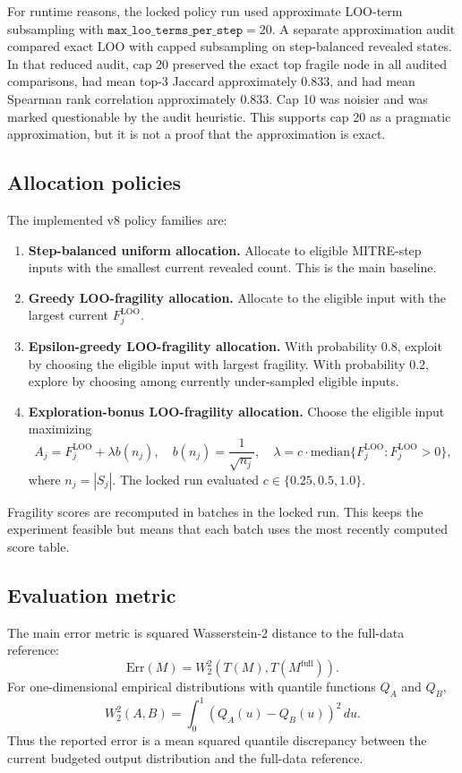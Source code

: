 \documentclass[11pt]{article}
\newcommand{\wtsq}{W_2^2}
\begin{document}
For runtime reasons, the locked policy run used approximate LOO-term subsampling with \(\texttt{max\_loo\_terms\_per\_step}=20\). A separate approximation audit compared exact LOO with capped subsampling on step-balanced revealed states. In that reduced audit, cap 20 preserved the exact top fragile node in all audited comparisons, had mean top-3 Jaccard approximately 0.833, and had mean Spearman rank correlation approximately 0.833. Cap 10 was noisier and was marked questionable by the audit heuristic. This supports cap 20 as a pragmatic approximation, but it is not a proof that the approximation is exact.

\subsection{Allocation policies}

The implemented v8 policy families are:
\begin{enumerate}
    \item \textbf{Step-balanced uniform allocation.} Allocate to eligible MITRE-step inputs with the smallest current revealed count. This is the main baseline.
    \item \textbf{Greedy LOO-fragility allocation.} Allocate to the eligible input with the largest current \(F_j^{\mathrm{LOO}}\).
    \item \textbf{Epsilon-greedy LOO-fragility allocation.} With probability \(0.8\), exploit by choosing the eligible input with largest fragility. With probability \(0.2\), explore by choosing among currently under-sampled eligible inputs.
    \item \textbf{Exploration-bonus LOO-fragility allocation.} Choose the eligible input maximizing
    \[
    A_j = F_j^{\mathrm{LOO}} + \lambda b(n_j),
    \quad
    b(n_j)=\frac{1}{\sqrt{n_j}},
    \quad
    \lambda = c \cdot \mathrm{median}\{F_j^{\mathrm{LOO}}: F_j^{\mathrm{LOO}}>0\},
    \]
    where \(n_j=|S_j|\). The locked run evaluated \(c\in\{0.25,0.5,1.0\}\).
\end{enumerate}

Fragility scores are recomputed in batches in the locked run. This keeps the experiment feasible but means that each batch uses the most recently computed score table.

\subsection{Evaluation metric}

The main error metric is squared Wasserstein-2 distance to the full-data reference:
\[
\mathrm{Err}(M)=\wtsq\left(T(M),T(M^{\mathrm{full}})\right).
\]
For one-dimensional empirical distributions with quantile functions \(Q_A\) and \(Q_B\),
\[
\wtsq(A,B)=\int_0^1 \left(Q_A(u)-Q_B(u)\right)^2\,du.
\]
Thus the reported error is a mean squared quantile discrepancy between the current budgeted output distribution and the full-data reference.
\end{document}
